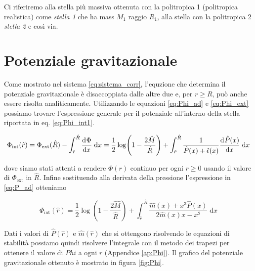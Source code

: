 \documentclass[a4paper, titlepage]{article}
\begin{document}
Ci riferiremo alla stella più massiva ottenuta con la politropica 1 (politropica
realistica) come \textit{stella 1} che ha mass $M_1$ raggio $R_1$, alla stella
con la politropica 2 \textit{ stella 2} e così via.

\section{Potenziale gravitazionale}

Come mostrato nel sistema \ref{eq:sistema_corr}, l'equzione che determina il
potenziale gravitazionale è disaccoppiata dalle altre due e, per $r \geq R$,
può anche essere risolta analiticamente.
Utilizzando le equazioni \ref{eq:Phi_ad} e \ref{eq:Phi_ext} possiamo trovare
l'espressione generale per il potenziale all'interno della stella riportata in
eq. \ref{eq:Phi_int1}.

\begin{equation}
    \Phi_\text{int} (\hat r) =
    \Phi_\text{ext} (\hat R) - \int_{\hat r}^{\hat R} \dv[]{\Phi}{x} \;\mathrm{d}x =
    \frac{1}{2} \log(1 - \frac{2 \hat M}{\hat R})
    + \int_{\hat r}^{\hat R} \frac{1}{\hat P (x) + \hat \epsilon (x)} \dv[]{\hat P (x)}{x} \;\mathrm{d}x
    \label{eq:Phi_int1}
\end{equation}

dove siamo stati attenti a rendere $\Phi (r)$ continuo per ogni $r \geq 0$
usando il valore di $\Phi_\text{ext}$ in $\hat R$. Infine sostituendo alla
derivata della pressione l'espressione in \ref{eq:P_ad} otteniamo

\begin{equation}
    \Phi_\text{int} (\hat r) =
    \frac{1}{2} \log(1 - \frac{2 \hat{M}}{\hat R}) + \int_{\hat r}^{\hat R}
    \frac{\hat m (x) + x^3 \hat P (x)}{2 \hat m (x) x - x^2}  \;\mathrm{d}x
    \label{eq:Phi_int2}
\end{equation}

Dati i valori di $\hat P (\hat r)$ e $\hat m (\hat r)$ che si ottengono
risolvendo le equazioni di stabilità possiamo quindi risolvere l'integrale con
il metodo dei trapezi per ottenere il valore di $Phi$ a ogni $r$ (Appendice
\ref{ap:Phi}).
Il grafico del potenziale gravitazionale ottenuto è mostrato in figura
\ref{fig:Phi}.
\end{document}
